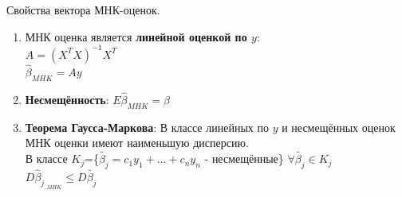 \documentclass{article}
\begin{document}
\vspace{2ex}
Свойства вектора МНК-оценок.
\begin{enumerate}
\item МНК оценка является \textbf{линейной оценкой по $y$}:\\
$A=(X^TX)^{-1}X^T$\\
$\hat{\beta}_{MHK}=Ay$
\item \textbf{Несмещённость}: $E\hat{\beta}_{MHK}=\beta$
\item \textbf{Теорема Гаусса-Маркова}: В классе линейных по $y$ и несмещённых оценок МНК оценки имеют наименьшую дисперсию.\\
В классе $K_j$=\{$\widetilde{\beta_j}=c_1y_1+...+c_ny_n$ - несмещённые\} \quad $\forall\widetilde{\beta_j} \in K_j \; $ $D\hat{\beta}_j_{,MHK} \leq D\widetilde{\beta_j}$
\end{enumerate}

 \vspace{4ex}
\end{document}
